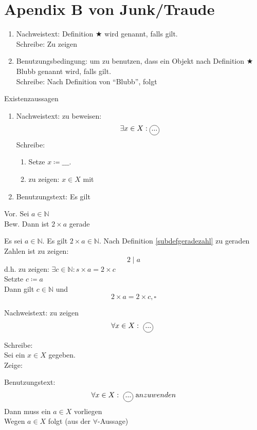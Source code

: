 \documentclass{myclass}
\begin{document}
\section{Apendix B von Junk/Traude}
\begin{definition}
	\label{def:B.10}
	\begin{enumerate}[label=]
		\item Nachweistext: Definition $\bigstar$ wird  genannt, falls  gilt.\\
			Schreibe: Zu zeigen 
		\item Benutzungsbedingung: um zu benutzen, dass ein Objekt nach Definition $\bigstar$ Blubb genannt wird, falls  gilt.\\
			Schreibe: Nach Definition von ``Blubb'', folgt 
	\end{enumerate}
	 Existenzaussagen
	\begin{enumerate}[label=]
		\item Nachweistext: zu beweisen:
			\[ \exists x \in X : \circled{\text{...}} \]
			Schreibe:
			\begin{enumerate}[label=]
				\item Setze $x \coloneqq \_ \_ \_$.
				\item zu zeigen: $ x \in X$ mit 
			\end{enumerate}
		\item Benutzungstext: Es gilt
	\end{enumerate}
	\begin{example}
		Vor. Sei $a \in \mathbb{N}$\\
		Bew. Dann ist $2 \times a$ gerade\par
		Es sei $a \in \mathbb{N}$. Es gilt $2 \times a \in \mathbb{N}$. Nach Definition \ref{subdefgeradezahl} zu geraden Zahlen ist zu zeigen:
		\[ 2 \mid a \]
		d.h. zu zeigen: $ \exists c \in \mathbb{N} : s \times a = 2 \times c $\\
		Setzte $ c \coloneqq a $\\
		Dann gilt $ c \in \mathbb{N} $ und
		\[ 2 \times a = 2 \times c, \square \]
	\end{example}
\end{definition}

\begin{definition}
	\label{def:B.6}
	Nachweistext: zu zeigen
	\[ \forall x \in X : \text{\circled{...}} \]
	\begin{indentpar}
		\indent Schreibe:\\
		Sei ein $ x \in X $ gegeben.\\
		Zeige: 
	\end{indentpar}
	Benutzungstext:
	\begin{equation}
		\label{B.6.1}
		\forall x \in X : \text{\circled{...}} \text anzuwenden
	\end{equation}
	Dann muss ein $ a \in X $ vorliegen\\
	Wegen $ a \in X $ folgt (aus der $\forall$-Aussage)\\
	\indent{}
\end{definition}
\end{document}
